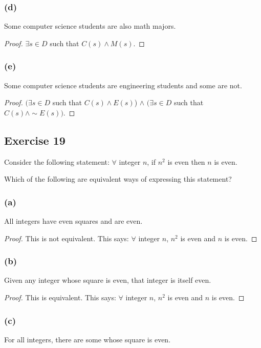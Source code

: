 \documentclass[14pt]{extarticle}
\newcommand{\fa}{\forall}
\newcommand{\te}{\exists}
\begin{document}
\subsubsection{(d)}
Some computer science students are also math majors.

\begin{proof}
$\te s \in D$ such that $C(s) \wedge M(s)$.
\end{proof}

\subsubsection{(e)}
Some computer science students are engineering students and some are not.

\begin{proof}
$(\te s \in D$ such that $C(s) \wedge E(s)$) $\wedge$ $(\te s \in D$ such that $C(s) \wedge \sim E(s))$.
\end{proof}

\subsection{Exercise 19}
Consider the following statement: $\fa$ integer $n$, if $n^2$ is even then $n$ is even.

Which of the following are equivalent ways of expressing this statement?

\subsubsection{(a)}
All integers have even squares and are even.

\begin{proof}
This is not equivalent. This says: $\fa$ integer $n$, $n^2$ is even and $n$ is even.
\end{proof}

\subsubsection{(b)}
Given any integer whose square is even, that integer is itself even.

\begin{proof}
This is equivalent. This says: $\fa$ integer $n$, $n^2$ is even and $n$ is even.
\end{proof}

\subsubsection{(c)}
For all integers, there are some whose square is even.
\end{document}

